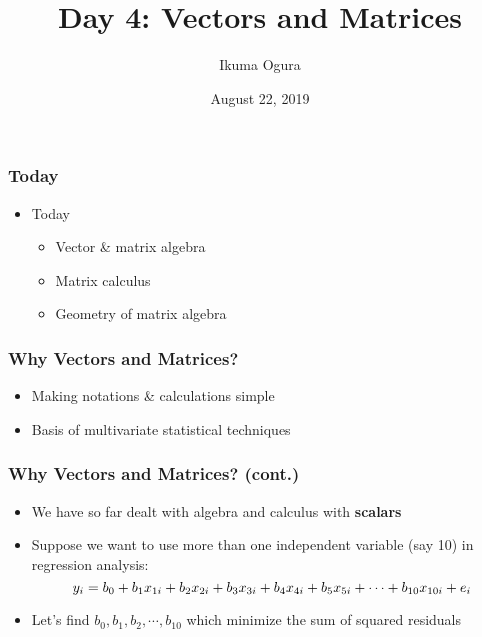 \documentclass[pdflatex, 12pt]{beamer}
\title[Math Camp]{Day 4: Vectors and Matrices}
\author[Ikuma Ogura]{Ikuma Ogura}
\institute[Georgetown]{Ph.D. student, Department of Government, Georgetown University}
\date[August 22, 2019]{August 22, 2019}
\begin{document}
\begin{frame}
\frametitle{}
\titlepage
\end{frame}

\begin{frame}
\frametitle{Today}
\begin{itemize}
\item Today
 \begin{itemize}
 \item Vector \& matrix algebra
 \item Matrix calculus
 \item Geometry of matrix algebra
 \end{itemize}
\end{itemize}
\end{frame}

\begin{frame}
\frametitle{Why Vectors and Matrices?}
\begin{itemize}
\item Making notations \& calculations simple
\vspace{0.4cm}
\item Basis of multivariate statistical techniques
\end{itemize}
\end{frame}

\begin{frame}
\frametitle{Why Vectors and Matrices? (cont.)}
\begin{itemize}
\item We have so far dealt with algebra and calculus with \textbf{scalars}
\vspace{0.4cm}
\item Suppose we want to use more than one independent variable (say 10) in regression analysis:
 \begin{equation}
 y_i = b_0 + b_1 x_{1i} + b_2 x_{2i} + b_3 x_{3i} + b_4 x_{4i} + b_5 x_{5i} + \cdots + b_{10} x_{10i} + e_i \notag
 \end{equation}
\item Let's find $b_0, b_1, b_2, \cdots, b_{10}$ which minimize the sum of squared residuals
\end{itemize}
\end{frame}
\end{document}
